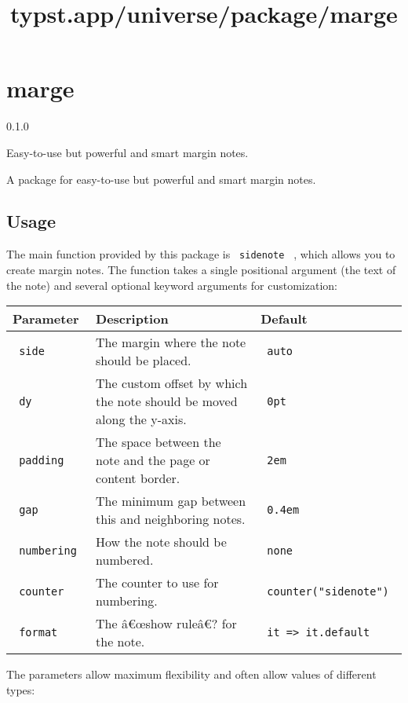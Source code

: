 \title{typst.app/universe/package/marge}

\label{banner}
\section{marge}\label{marge}

{ 0.1.0 }

Easy-to-use but powerful and smart margin notes.

\label{readme}
A package for easy-to-use but powerful and smart margin notes.

\subsection{Usage}\label{usage}

The main function provided by this package is \texttt{\ sidenote\ } ,
which allows you to create margin notes. The function takes a single
positional argument (the text of the note) and several optional keyword
arguments for customization:

\begin{longtable}[]{@{}lll@{}}
\toprule\noalign{}
Parameter & Description & Default \\
\midrule\noalign{}
\endhead
\bottomrule\noalign{}
\endlastfoot
\texttt{\ side\ } & The margin where the note should be placed. &
\texttt{\ auto\ } \\
\texttt{\ dy\ } & The custom offset by which the note should be moved
along the y-axis. & \texttt{\ 0pt\ } \\
\texttt{\ padding\ } & The space between the note and the page or
content border. & \texttt{\ 2em\ } \\
\texttt{\ gap\ } & The minimum gap between this and neighboring notes. &
\texttt{\ 0.4em\ } \\
\texttt{\ numbering\ } & How the note should be numbered. &
\texttt{\ none\ } \\
\texttt{\ counter\ } & The counter to use for numbering. &
\texttt{\ counter("sidenote")\ } \\
\texttt{\ format\ } & The â€œshow ruleâ€? for the note. &
\texttt{\ it\ =\textgreater{}\ it.default\ } \\
\end{longtable}

The parameters allow maximum flexibility and often allow values of
different types:

